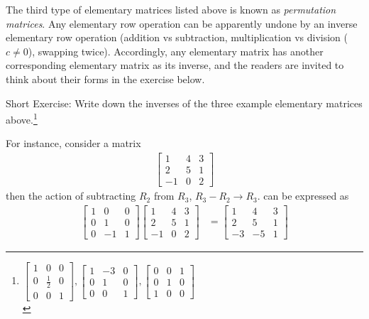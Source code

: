 The third type of elementary matrices listed above is known as \textit{permutation matrices}. Any elementary row operation can be apparently undone by an inverse elementary row operation (addition vs subtraction, multiplication vs division ($c \neq 0$), swapping twice). Accordingly, any elementary matrix has another corresponding elementary matrix as its inverse, and the readers are invited to think about their forms in the exercise below. \par
Short Exercise: Write down the inverses of the three example elementary matrices above.\footnote{$
\begin{bmatrix}
1 & 0 & 0 \\
0 & \frac{1}{2} & 0 \\
0 & 0 & 1
\end{bmatrix},
\begin{bmatrix}
1 & -3 & 0 \\
0 & 1 & 0 \\
0 & 0 & 1
\end{bmatrix},
\begin{bmatrix}
0 & 0 & 1 \\
0 & 1 & 0 \\
1 & 0 & 0
\end{bmatrix}
$\\}\par
For instance, consider a matrix
\begin{align*}
\begin{bmatrix}
1 & 4 & 3 \\
2 & 5 & 1 \\
-1 & 0 & 2
\end{bmatrix}     
\end{align*}
then the action of subtracting $R_2$ from $R_3$, $R_3 - R_2 \to R_3$. can be expressed as
\begin{align*}
\begin{bmatrix}
1 & 0 & 0 \\
0 & 1 & 0 \\
0 & -1 & 1
\end{bmatrix} 
\begin{bmatrix}
1 & 4 & 3 \\
2 & 5 & 1 \\
-1 & 0 & 2
\end{bmatrix} 
&= 
\begin{bmatrix}
1 & 4 & 3 \\
2 & 5 & 1 \\
-3 & -5 & 1
\end{bmatrix} 
\end{align*}
